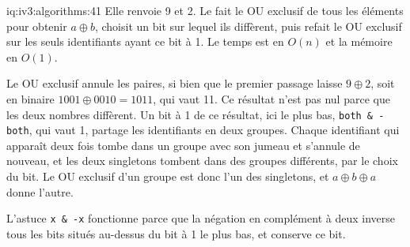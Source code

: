 \begin{solution}{iq:iv3:algorithms:41}
Elle renvoie 9 et 2. Le  fait le OU exclusif de tous les éléments pour obtenir $a \oplus b$, choisit un bit sur lequel ils diffèrent, puis refait le OU exclusif sur les seuls identifiants ayant ce bit à 1. Le temps est en $O(n)$ et la mémoire en $O(1)$.
\label{lst:iv3:al:twosingles}

Le OU exclusif annule les paires, si bien que le premier passage laisse $9 \oplus 2$, soit en binaire $1001 \oplus 0010 = 1011$, qui vaut 11. Ce résultat n'est pas nul parce que les deux nombres diffèrent. Un bit à 1 de ce résultat, ici le plus bas, \texttt{both \& -both}, qui vaut 1, partage les identifiants en deux groupes. Chaque identifiant qui apparaît deux fois tombe dans un groupe avec son jumeau et s'annule de nouveau, et les deux singletons tombent dans des groupes différents, par le choix du bit. Le OU exclusif d'un groupe est donc l'un des singletons, et $a \oplus b \oplus a$ donne l'autre.

L'astuce \texttt{x \& -x} fonctionne parce que la négation en complément à deux inverse tous les bits situés au-dessus du bit à 1 le plus bas, et conserve ce bit.

\end{solution}

